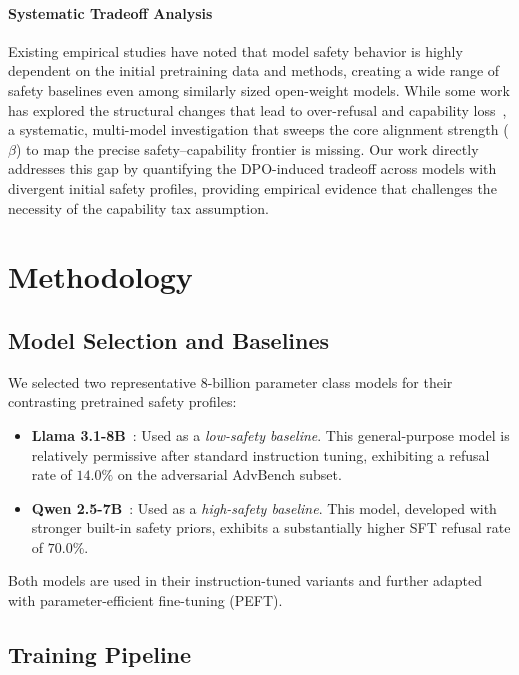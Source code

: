 \documentclass[a4paper, twocolumn, 9pt]{article}
\begin{document}
\paragraph{Systematic Tradeoff Analysis}
Existing empirical studies have noted that model safety behavior is highly dependent on the initial pretraining data and methods, creating a wide range of safety baselines even among similarly sized open-weight models. While some work has explored the structural changes that lead to over-refusal and capability loss~\cite{llm-overrefusal}, a systematic, multi-model investigation that sweeps the core alignment strength ($\beta$) to map the precise safety--capability frontier is missing. Our work directly addresses this gap by quantifying the DPO-induced tradeoff across models with divergent initial safety profiles, providing empirical evidence that challenges the necessity of the capability tax assumption.

\section{Methodology}
\label{sec:method}

\subsection{Model Selection and Baselines}

We selected two representative 8-billion parameter class models for their contrasting pretrained safety profiles:

\begin{itemize}
\item \textbf{Llama 3.1-8B}~\cite{llama3}: Used as a \emph{low-safety baseline}. This general-purpose model is relatively permissive after standard instruction tuning, exhibiting a refusal rate of $14.0\%$ on the adversarial AdvBench subset.
\item \textbf{Qwen 2.5-7B}~\cite{qwen2.5}: Used as a \emph{high-safety baseline}. This model, developed with stronger built-in safety priors, exhibits a substantially higher SFT refusal rate of $70.0\%$.
\end{itemize}

Both models are used in their instruction-tuned variants and further adapted with parameter-efficient fine-tuning (PEFT).

\subsection{Training Pipeline}
\end{document}
